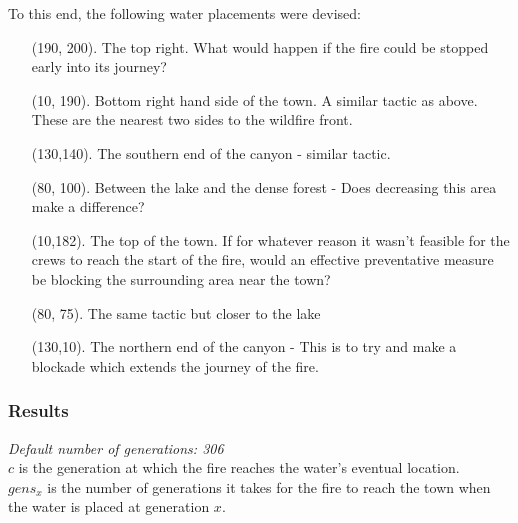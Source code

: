 \documentclass[11pt, a4paper, titlepage]{article}
\begin{document}
  To this end, the following water placements were devised:

  \begin{itemize}
    \item[(190, 200).]  The top right. What would happen if the fire could be stopped early into its journey?
    \item[ (10, 190).] Bottom right hand side of the town. A similar tactic as above. These are the nearest two sides to the wildfire front.
    \item[(130,140).] The southern end of the canyon - similar tactic.
    \item[ (80, 100).] Between the lake and the dense forest - Does decreasing this area make a difference?
    \item[ (10,182).] The top of the town. If for whatever reason it wasn't feasible for the crews to reach the start of the fire, would an effective preventative measure be blocking the surrounding area near the town?
    \item[ (80, 75).] The same tactic but closer to the lake    
    \item[(130,10).] The northern end of the canyon - This is to try and make a blockade which extends the journey of the fire.
  \end{itemize}

  \subsubsection{Results}


    \textit{Default number of generations: 306} \\
    $c$ is the generation at which the fire reaches the water's eventual location. \\
    $gens_{x}$ is the number of generations it takes for the fire to reach the town when the water is placed at generation $x$.
\end{document}
